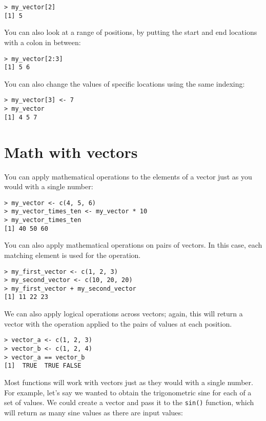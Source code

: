 \documentclass[12pt,]{book}
\begin{document}
\begin{verbatim}
> my_vector[2]
[1] 5
\end{verbatim}

You can also look at a range of positions, by putting the start and end locations with a colon in between:

\begin{verbatim}
> my_vector[2:3]
[1] 5 6
\end{verbatim}

You can also change the values of specific locations using the same indexing:

\begin{verbatim}
> my_vector[3] <- 7
> my_vector
[1] 4 5 7
\end{verbatim}

\hypertarget{math-with-vectors}{%
\section{Math with vectors}\label{math-with-vectors}}

You can apply mathematical operations to the elements of a vector just as you would with a single number:

\begin{verbatim}
> my_vector <- c(4, 5, 6)
> my_vector_times_ten <- my_vector * 10
> my_vector_times_ten
[1] 40 50 60
\end{verbatim}

You can also apply mathematical operations on pairs of vectors. In this case, each matching element is used for the operation.

\begin{verbatim}
> my_first_vector <- c(1, 2, 3)
> my_second_vector <- c(10, 20, 20)
> my_first_vector + my_second_vector
[1] 11 22 23
\end{verbatim}

We can also apply logical operations across vectors; again, this will return a vector with the operation applied to the pairs of values at each position.

\begin{verbatim}
> vector_a <- c(1, 2, 3)
> vector_b <- c(1, 2, 4)
> vector_a == vector_b
[1]  TRUE  TRUE FALSE

\end{verbatim}

Most functions will work with vectors just as they would with a single number. For example, let's say we wanted to obtain the trigonometric sine for each of a set of values. We could create a vector and pass it to the \texttt{sin()} function, which will return as many sine values as there are input values:
\end{document}
